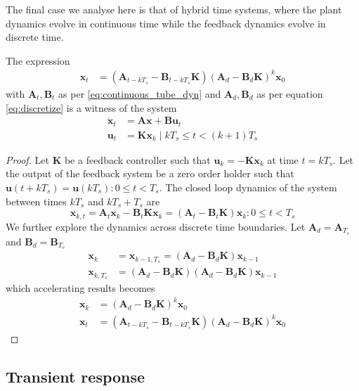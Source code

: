 \documentclass[sigconf]{llncs}
\newcommand{\mat}[1]{\boldsymbol{#1}}
\renewcommand{\vec}[1]{\boldsymbol{#1}}
\begin{document}
The final case we analyse here is that of hybrid time systems, where the
plant dynamics evolve in continuous time while the feedback dynamics evolve
in discrete time.

\begin{theorem}
The expression
 \begin{align}
 \vec{x}_{t} &= (\mat{A}_{t-kT_s}-\mat{B}_{t-kT_s}\mat{K}) (\mat{A}_d-\mat{B}_d\mat{K})^k\vec{x}_0
 \label{eq:cyber_feedback}
 \end{align}
 with $\mat{A}_t, \mat{B}_t$ as per \eqref{eq:continuous_tube_dyn} and $\mat{A}_d, \mat{B}_d$ as per equation \eqref{eq:discretize} is a witness of the system
 \begin{align}
 \dot{\vec{x}}_{t} &= \mat{A}\vec{x}+\mat{B}\vec{u}_t\nonumber\\
 \vec{u}_t&=\mat{K}\vec{x}_k  \mid  kT_s \leq t < (k+1)T_s
 \end{align}
 \end{theorem}

\begin{proof}
Let $\mat{K}$ be a feedback controller such that $\vec{u}_k=-\mat{K}\vec{x}_k$ at time $t=kT_s$. Let the output of
the feedback system be a zero order holder such that $\vec{u}(t+kT_s)=\vec{u}(kT_s) : 0 \leq t < T_s$.
The closed loop dynamics of the system between times $kT_s$ and $kT_s+T_s$ are
\begin{equation}
\vec{x}_{k,t}=\mat{A}_t\vec{x}_k-\mat{B}_t\mat{K}\vec{x}_k = (\mat{A}_t-\mat{B}_t\mat{K})\vec{x}_k : 0 \leq t < T_s
\end{equation}
We further explore the dynamics across discrete time boundaries. Let $\mat{A}_d=\mat{A}_{T_s}$ and $\mat{B}_d=\mat{B}_{T_s}$
\begin{align}
\vec{x}_{k}&=\vec{x}_{k-1,T_s}= (\mat{A}_d-\mat{B}_d\mat{K})\vec{x}_{k-1}\\
\vec{x}_{k,T_s} &= (\mat{A}_d-\mat{B}_d\mat{K}) (\mat{A}_d-\mat{B}_d\mat{K})\vec{x}_{k-1}
\end{align}
which accelerating results becomes
\begin{align}
\label{eq:feedback_sampled_cont}
\vec{x}_{k} &= (\mat{A}_d-\mat{B}_d\mat{K}) ^k\vec{x}_0\\
\vec{x}_{t} &= (\mat{A}_{t-kT_s}-\mat{B}_{t-kT_s}\mat{K}) (\mat{A}_d-\mat{B}_d\mat{K})^k\vec{x}_0
\label{eq:feedback_cont}
\end{align}
\end{proof}

\subsection{Transient response} 
\label{asec:transientspecification}
\end{document}

